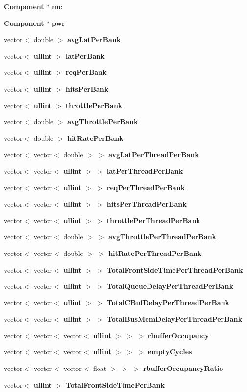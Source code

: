 \begin{CompactItemize}
\item 
{\bf Component} $\ast$ {\bf mc}
\item 
{\bf Component} $\ast$ {\bf pwr}
\item 
vector$<$ double $>$ {\bf avgLatPerBank}
\item 
vector$<$ {\bf ullint} $>$ {\bf latPerBank}
\item 
vector$<$ {\bf ullint} $>$ {\bf reqPerBank}
\item 
vector$<$ {\bf ullint} $>$ {\bf hitsPerBank}
\item 
vector$<$ {\bf ullint} $>$ {\bf throttlePerBank}
\item 
vector$<$ double $>$ {\bf avgThrottlePerBank}
\item 
vector$<$ double $>$ {\bf hitRatePerBank}
\item 
vector$<$ vector$<$ double $>$ $>$ {\bf avgLatPerThreadPerBank}
\item 
vector$<$ vector$<$ {\bf ullint} $>$ $>$ {\bf latPerThreadPerBank}
\item 
vector$<$ vector$<$ {\bf ullint} $>$ $>$ {\bf reqPerThreadPerBank}
\item 
vector$<$ vector$<$ {\bf ullint} $>$ $>$ {\bf hitsPerThreadPerBank}
\item 
vector$<$ vector$<$ {\bf ullint} $>$ $>$ {\bf throttlePerThreadPerBank}
\item 
vector$<$ vector$<$ double $>$ $>$ {\bf avgThrottlePerThreadPerBank}
\item 
vector$<$ vector$<$ double $>$ $>$ {\bf hitRatePerThreadPerBank}
\item 
vector$<$ vector$<$ {\bf ullint} $>$ $>$ {\bf TotalFrontSideTimePerThreadPerBank}
\item 
vector$<$ vector$<$ {\bf ullint} $>$ $>$ {\bf TotalQueueDelayPerThreadPerBank}
\item 
vector$<$ vector$<$ {\bf ullint} $>$ $>$ {\bf TotalCBufDelayPerThreadPerBank}
\item 
vector$<$ vector$<$ {\bf ullint} $>$ $>$ {\bf TotalBusMemDelayPerThreadPerBank}
\item 
vector$<$ vector$<$ vector$<$ {\bf ullint} $>$ $>$ $>$ {\bf rbufferOccupancy}
\item 
vector$<$ vector$<$ vector$<$ {\bf ullint} $>$ $>$ $>$ {\bf emptyCycles}
\item 
vector$<$ vector$<$ vector$<$ float $>$ $>$ $>$ {\bf rbufferOccupancyRatio}
\item 
vector$<$ {\bf ullint} $>$ {\bf TotalFrontSideTimePerBank}

\end{CompactItemize}
